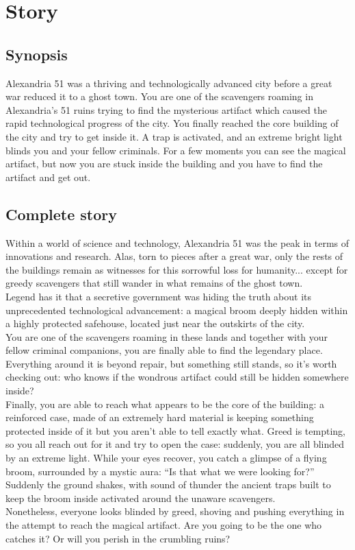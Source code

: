 \section{Story}

\subsection{Synopsis}

Alexandria 51 was a thriving and technologically advanced city before a great war reduced it to a ghost town. You are one of the scavengers roaming in Alexandria’s 51 ruins trying to find the mysterious artifact which caused the rapid technological progress of the city. You finally reached the core building of the city and try to get inside it. A trap is activated, and an extreme bright light blinds you and your fellow criminals. For a few moments you can see the magical artifact, but now you are stuck inside the building and you have to find the artifact and get out.

\subsection{Complete story}

Within a world of science and technology, Alexandria 51 was the peak in terms of innovations and research. Alas, torn to pieces after a great war, only the rests of the buildings remain as witnesses for this sorrowful loss for humanity... except for greedy scavengers that still wander in what remains of the ghost town.\\
Legend has it that a secretive government was hiding the truth about its unprecedented technological advancement: a magical broom deeply hidden within a highly protected safehouse, located just near the outskirts of the city.\\
You are one of the scavengers roaming in these lands and together with your fellow criminal companions, you are finally able to find the legendary place. Everything around it is beyond repair, but something still stands, so it’s worth checking out: who knows if the wondrous artifact could still be hidden somewhere inside?\\
Finally, you are able to reach what appears to be the core of the building: a reinforced case, made of an extremely hard material is keeping something protected inside of it but you aren’t able to tell exactly what. Greed is tempting, so you all reach out for it and try to open the case: suddenly, you are all blinded by an extreme light. While your eyes recover, you catch a glimpse of a flying broom, surrounded by a mystic aura: “Is that what we were looking for?”\\
Suddenly the ground shakes, with sound of thunder the ancient traps built to keep the broom inside activated around the unaware scavengers.\\
Nonetheless, everyone looks blinded by greed, shoving and pushing everything in the attempt to reach the magical artifact. Are you going to be the one who catches it? Or will you perish in the crumbling ruins?\\

